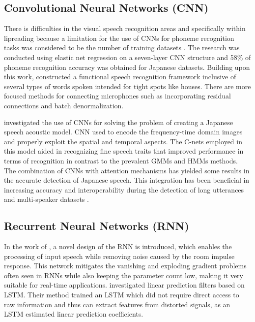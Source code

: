 \subsection{Convolutional Neural Networks (CNN)}
There is difficulties in the visual speech recognition areas and specifically within lipreading because a limitation for the use of CNNs for phoneme recognition tasks was considered to be the number of training datasets \parencite{noda2014lipreading}. The research was conducted using elastic net regression on a seven-layer CNN structure and 58\% of phoneme recognition accuracy was obtained for Japanese datasets. Building upon this work, \textcite{yalta2019cnn} constructed a functional speech recognition framework inclusive of several types of words spoken intended for tight spots like houses. There are more focused methods for connecting microphones such as incorporating residual connections and batch denormalization. 

\textcite{noda2014lipreading} investigated the use of CNNs for solving the problem of creating a Japanese speech acoustic model. CNN used to encode the frequency-time domain images and properly exploit the spatial and temporal aspects. The C-nets employed in this model aided in recognizing fine speech traits that improved performance in terms of recognition in contrast to the prevalent GMMs and HMMs methods. The combination of CNNs with attention mechanisms has yielded some results in the accurate detection of Japanese speech. This integration has been beneficial in increasing accuracy and interoperability during the detection of long utterances and multi-speaker datasets \parencite{Mukohara2015Emotion}.


\subsection{Recurrent Neural Networks (RNN)}
In the work of \textcite{takeuchi2020real}, a novel design of the RNN is introduced, which enables the processing of input speech while removing noise caused by the room impulse response. This network mitigates the vanishing and exploding gradient problems often seen in RNNs while also keeping the parameter count low, making it very suitable for real-time applications. \textcite{Kida2016LSTM} investigated linear prediction filters based on LSTM. Their method trained an LSTM which did not require direct access to raw information and thus can extract features from distorted signals, as an LSTM estimated linear prediction coefficients. 

